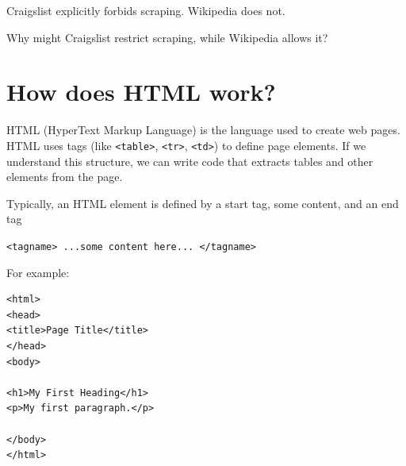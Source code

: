 \documentclass[
  letterpaper,
  DIV=11,
  numbers=noendperiod]{scrartcl}
\begin{document}
Craigslist explicitly forbids scraping. Wikipedia does not.

\begin{tcolorbox}[enhanced jigsaw, toprule=.15mm, colbacktitle=quarto-callout-note-color!10!white, breakable, bottomtitle=1mm, leftrule=.75mm, arc=.35mm, coltitle=black, opacitybacktitle=0.6, opacityback=0, bottomrule=.15mm, colframe=quarto-callout-note-color-frame, toptitle=1mm, colback=white, left=2mm, titlerule=0mm, title=\textcolor{quarto-callout-note-color}{\faInfo}\hspace{0.5em}{Note}, rightrule=.15mm]

Why might Craigslist restrict scraping, while Wikipedia allows it?

\end{tcolorbox}

\hypertarget{how-does-html-work}{%
\section{How does HTML work?}\label{how-does-html-work}}

HTML (HyperText Markup Language) is the language used to create web
pages. HTML uses tags (like \texttt{\textless{}table\textgreater{}},
\texttt{\textless{}tr\textgreater{}},
\texttt{\textless{}td\textgreater{}}) to define page elements. If we
understand this structure, we can write code that extracts tables and
other elements from the page.

\begin{tcolorbox}[enhanced jigsaw, toprule=.15mm, colbacktitle=quarto-callout-tip-color!10!white, breakable, bottomtitle=1mm, leftrule=.75mm, arc=.35mm, coltitle=black, opacitybacktitle=0.6, opacityback=0, bottomrule=.15mm, colframe=quarto-callout-tip-color-frame, toptitle=1mm, colback=white, left=2mm, titlerule=0mm, title=\textcolor{quarto-callout-tip-color}{\faLightbulb}\hspace{0.5em}{Tip}, rightrule=.15mm]

Typically, an HTML element is defined by a start tag, some content, and
an end tag

\texttt{\textless{}tagname\textgreater{}\ ...some\ content\ here...\ \textless{}/tagname\textgreater{}}

\end{tcolorbox}

For example:

\begin{verbatim}
<html>
<head>
<title>Page Title</title>
</head>
<body>

<h1>My First Heading</h1>
<p>My first paragraph.</p>

</body>
</html>
\end{verbatim}
\end{document}
